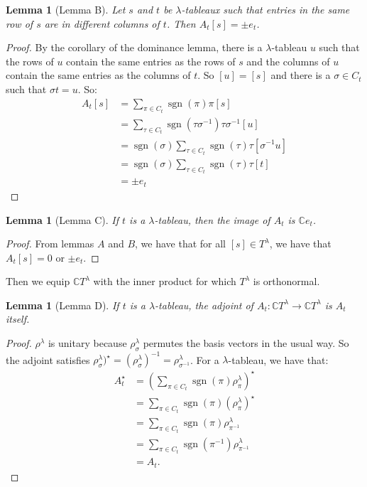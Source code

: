 \documentclass[]{report}
\newtheorem{lemma}[theorem]{Lemma}
\theoremstyle{definition}
\numberwithin{theorem}{section}
\numberwithin{equation}{section}
\newcommand{\sgn}{\operatorname{sgn}}
\begin{document}
\begin{lemma}[Lemma B]
	Let $s$ and $t$ be $\lambda$-tableaux such that entries in the same row of $s$ are in different columns of $t$. Then $A_t[s] = \pm e_t$. 
\end{lemma}
\begin{proof}
	By the corollary of the dominance lemma, there is a $\lambda$-tableau $u$ such that the rows of $u$ contain the same entries as the rows of $s$ and the columns of $u$ contain the same entries as the columns of $t$. So $[u] = [s]$ and there is a $\sigma \in C_t$ such that $\sigma t = u$. 
	So:
	\begin{align*}
		A_t[s] &= \sum_{\pi \in C_t} \sgn(\pi) \pi[s]\\
		&= \sum_{\tau \in C_t} \sgn(\tau \sigma^{-1}) \tau \sigma^{-1} [u]\\
		&= \sgn(\sigma) \sum_{\tau \in C_t} \sgn(\tau) \tau[\sigma^{-1} u]\\
		&= \sgn(\sigma) \sum_{\tau \in C_t} \sgn(\tau) \tau[t]\\
		&= \pm e_t
	\end{align*}
\end{proof}
\begin{lemma}[Lemma C]
	If $t$ is a $\lambda$-tableau, then the image of $A_t$ is $\mathbb{C} e_t$.
\end{lemma}
\begin{proof}
	From lemmas $A$ and $B$, we have that for all $[s] \in T^\lambda$, we have that $A_t[s] = 0$ or $\pm e_t$. 
\end{proof}
Then we equip $\mathbb{C} T^\lambda$ with the inner product for which $T^\lambda$ is orthonormal.
\begin{lemma}[Lemma D]
	If $t$ is a $\lambda$-tableau, the adjoint of $A_t : \mathbb{C} T^\lambda \rightarrow \mathbb{C} T^\lambda$ is $A_t$ itself.
\end{lemma} 
\begin{proof}
	$\rho^\lambda$ is unitary because $\rho^\lambda_\sigma$ permutes the basis vectors in the usual way. So the adjoint satisfies $\rho^\lambda_\sigma)^\star = (\rho^\lambda_\sigma)^{-1} = \rho^\lambda_{\sigma^{-1}}$. 
	For a $\lambda$-tableau, we have that:
	\begin{align*}
		A_t^\star &= \left(\sum_{\pi \in C_t} \sgn(\pi) \rho^\lambda_\pi \right)^\star\\
		&=\sum_{\pi \in C_t} \sgn(\pi) \left(\rho^\lambda_\pi \right)^\star\\
		&= \sum_{\pi \in C_t} \sgn(\pi) \rho^\lambda_{\pi^{-1}}\\
		&= \sum_{\pi \in C_t} \sgn(\pi^{-1}) \rho^\lambda_{\pi^{-1}}\\
		&= A_t.
	\end{align*}
\end{proof}
\end{document}
